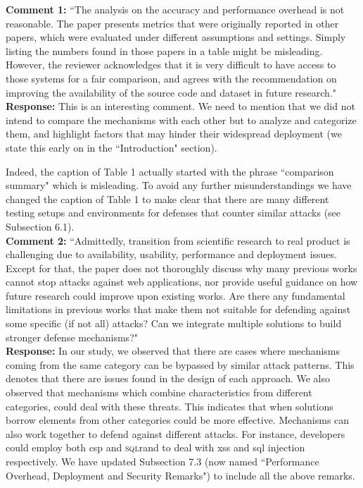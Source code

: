 \documentclass[10pt,journal,compsoc]{IEEEtran}
\begin{document}
{\bf Comment 1:} ``The analysis on the accuracy
and performance overhead is not reasonable.
The paper presents metrics that were originally
reported in other papers,
which were evaluated under different
assumptions and settings.
Simply listing the numbers found in those papers
in a table might be misleading.
However,
the reviewer acknowledges that it is very
difficult to have access to those systems for a fair comparison,
and agrees with the recommendation on improving
the availability of the source code and dataset
in future research."\\

\noindent
{\bf Response:}
This is an interesting comment.
We need to mention that we did not intend to
compare the mechanisms with each other
but to analyze and categorize them,
and highlight factors that may hinder
their widespread deployment
(we state this early on in the
``Introduction" section).

Indeed,
the caption of Table 1 actually
started with the phrase ``comparison summary"
which is misleading.
To avoid any further misunderstandings
we have changed the caption of Table 1
to make clear that there
are many different testing setups and
environments for defenses that counter
similar attacks (see Subsection 6.1).\\

\noindent
{\bf Comment 2:} ``Admittedly, transition
from scientific research to real product
is challenging due to availability, usability,
performance and deployment issues.
Except for that, the paper does not thoroughly
discuss why many previous works
cannot stop attacks against web applications,
nor provide useful guidance on
how future research could improve upon existing works.
Are there any fundamental
limitations in previous works that make
them not suitable for defending against
some specific (if not all) attacks?
Can we integrate multiple solutions to build
stronger defense mechanisms?"\\

\noindent
{\bf Response:}
In our study,
we observed that there are cases where
mechanisms coming from the same category
can be bypassed by similar attack patterns.
This denotes that there are issues
found in the design of each approach.
We also observed that mechanisms which
combine characteristics
from different categories,
could deal with these threats.
This indicates that when solutions
borrow elements from other categories
could be more effective.
Mechanisms can also work together
to defend against different attacks.
For instance,
developers could employ both {\sc csp}
and \textsc{sql}rand
to deal with {\sc xss} and
{\sc sql} injection respectively.
We have updated Subsection 7.3
(now named ``Performance Overhead,
Deployment and Security Remarks")
to include all the above remarks.\\
\end{document}
